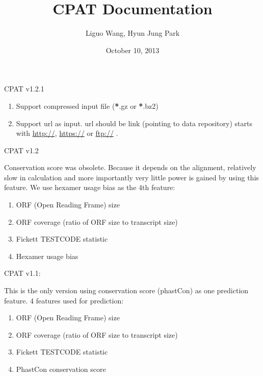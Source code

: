 \documentclass[letterpaper,10pt,english]{sphinxmanual}
\title{CPAT Documentation}
\date{October 10, 2013}
\author{Liguo Wang, Hyun Jung Park}
\begin{document}
\maketitle
\tableofcontents
{}\label{index::doc}



CPAT v1.2.1
\begin{enumerate}
\item {} 
Support compressed input file ({\color{red}\bfseries{}*}.gz or {\color{red}\bfseries{}*}.bz2)

\item {} 
Support url as input. url should be link (pointing to data repository) starts with \href{http://}{http://}, \href{https://}{https://} or \href{ftp://}{ftp://} .

\end{enumerate}

CPAT v1.2

Conservation score was obsolete. Because it depends on the alignment, relatively slow in
calculation and more importantly very little power is gained by using this feature. We
use hexamer usage bias as the 4th feature:
\begin{enumerate}
\item {} 
ORF (Open Reading Frame) size

\item {} 
ORF coverage (ratio of ORF size to transcript size)

\item {} 
Fickett TESTCODE statistic

\item {} 
Hexamer usage bias

\end{enumerate}

CPAT v1.1:

This is the only version using conservation score (phastCon) as one prediction feature. 4 features used for prediction:
\begin{enumerate}
\item {} 
ORF (Open Reading Frame) size

\item {} 
ORF coverage (ratio of ORF size to transcript size)

\item {} 
Fickett TESTCODE statistic

\item {} 
PhastCon conservation score

\end{enumerate}
\end{document}
